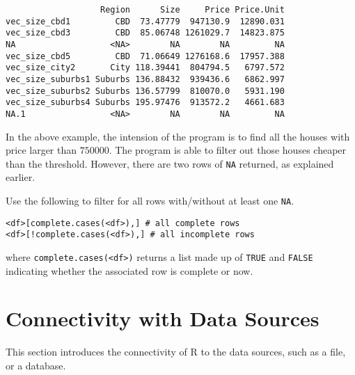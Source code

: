 \begin{lstlisting}
                   Region      Size     Price Price.Unit
vec_size_cbd1         CBD  73.47779  947130.9  12890.031
vec_size_cbd3         CBD  85.06748 1261029.7  14823.875
NA                   <NA>        NA        NA         NA
vec_size_cbd5         CBD  71.06649 1276168.6  17957.388
vec_size_city2       City 118.39441  804794.5   6797.572
vec_size_suburbs1 Suburbs 136.88432  939436.6   6862.997
vec_size_suburbs2 Suburbs 136.57799  810070.0   5931.190
vec_size_suburbs4 Suburbs 195.97476  913572.2   4661.683
NA.1                 <NA>        NA        NA         NA
\end{lstlisting}
In the above example, the intension of the program is to find all the houses with price larger than $750000$. The program is able to filter out those houses cheaper than the threshold. However, there are two rows of \verb|NA| returned, as explained earlier.







Use the following to filter for all rows with/without at least one \verb|NA|.
\begin{lstlisting}
<df>[complete.cases(<df>),] # all complete rows
<df>[!complete.cases(<df>),] # all incomplete rows
\end{lstlisting}
where \verb|complete.cases(<df>)| returns a list made up of \verb|TRUE| and \verb|FALSE| indicating whether the associated row is complete or now.





\section{Connectivity with Data Sources} \label{ch:r2:sec:datasource}

This section introduces the connectivity of R to the data sources, such as a file, or a database.







